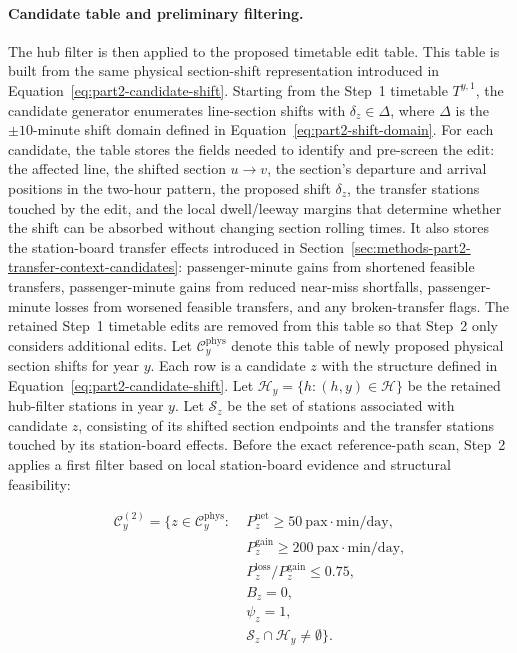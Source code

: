 \documentclass[preprint,12pt]{elsarticle}
\begin{document}
\paragraph*{Candidate table and preliminary filtering.}
The hub filter is then applied to the proposed timetable edit table. This table is built from the same physical section-shift representation introduced in Equation~\eqref{eq:part2-candidate-shift}. Starting from the Step~1 timetable \(T^{y,1}\), the candidate generator enumerates line-section shifts with \(\delta_z\in\Delta\), where \(\Delta\) is the \(\pm10\)-minute shift domain defined in Equation~\eqref{eq:part2-shift-domain}. For each candidate, the table stores the fields needed to identify and pre-screen the edit: the affected line, the shifted section \(u\rightarrow v\), the section's departure and arrival positions in the two-hour pattern, the proposed shift \(\delta_z\), the transfer stations touched by the edit, and the local dwell/leeway margins that determine whether the shift can be absorbed without changing section rolling times. It also stores the station-board transfer effects introduced in Section~\ref{sec:methods-part2-transfer-context-candidates}: passenger-minute gains from shortened feasible transfers, passenger-minute gains from reduced near-miss shortfalls, passenger-minute losses from worsened feasible transfers, and any broken-transfer flags. The retained Step~1 timetable edits are removed from this table so that Step~2 only considers additional edits. Let \(\mathcal{C}^{\mathrm{phys}}_y\) denote this table of newly proposed physical section shifts for year \(y\). Each row is a candidate \(z\) with the structure defined in Equation~\eqref{eq:part2-candidate-shift}. Let \(\mathcal{H}_y=\{h:(h,y)\in\mathcal{H}\}\) be the retained hub-filter stations in year \(y\). Let \(\mathcal{S}_z\) be the set of stations associated with candidate \(z\), consisting of its shifted section endpoints and the transfer stations touched by its station-board effects. Before the exact reference-path scan, Step~2 applies a first filter based on local station-board evidence and structural feasibility:

\begin{equation}
\begin{aligned}
\mathcal{C}^{(2)}_y
=
\{z\in\mathcal{C}^{\mathrm{phys}}_y:\;&
P^{\mathrm{net}}_z\ge50\ \mathrm{pax{\cdot}min/day},\\
&
P^{\mathrm{gain}}_z\ge200\ \mathrm{pax{\cdot}min/day},\\
&
P^{\mathrm{loss}}_z/P^{\mathrm{gain}}_z\le0.75,\\
&
B_z=0,\\
&
\psi_z=1,\\
&
\mathcal{S}_z\cap\mathcal{H}_y\ne\emptyset
\}.
\end{aligned}
\label{eq:part2-step2-static-filter}
\end{equation}
\end{document}

